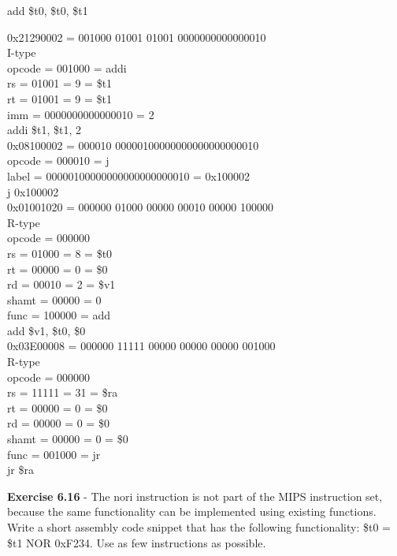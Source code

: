 \documentclass[12pt,a4paper]{report}
\begin{document}
\begin{normalsize}
add \$t0, \$t0, \$t1

0x21290002 = 001000 01001 01001 0000000000000010 \\
I-type \\
opcode = 001000 = addi \\
rs = 01001 = 9 = \$t1 \\
rt = 01001 = 9 = \$t1 \\
imm = 0000000000000010 = 2\\

addi \$t1, \$t1, 2 \\

0x08100002 = 000010 00000100000000000000000010 \\
opcode = 000010 = j \\
label = 00000100000000000000000010 = 0x100002 \\

j 0x100002 \\

0x01001020 = 000000 01000 00000 00010 00000 100000 \\
R-type \\
opcode = 000000 \\
rs = 01000 = 8 = \$t0 \\
rt = 00000 = 0 = \$0 \\
rd = 00010 = 2 = \$v1  \\
shamt = 00000 = 0 \\
func = 100000 = add \\

add \$v1, \$t0, \$0 \\

0x03E00008 = 000000 11111 00000 00000 00000 001000 \\
R-type \\
opcode = 000000 \\
rs = 11111 = 31 = \$ra \\
rt = 00000 = 0 = \$0 \\
rd = 00000 = 0 = \$0 \\
shamt = 00000 = 0 = \$0 \\
func = 001000 = jr \\

jr \$ra \\

\medskip

\textbf{Exercise 6.16} - The nori instruction is not part of the MIPS instruction set, because the same functionality can be implemented using existing functions. Write a short assembly code snippet that has the following functionality: \$t0 = \$t1 NOR 0xF234. Use as few instructions as possible. \\


\end{normalsize}
\end{document}
